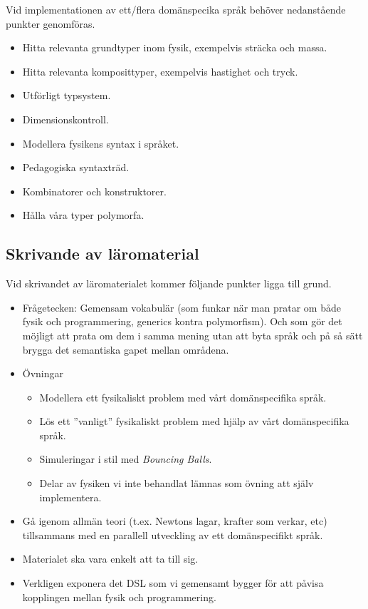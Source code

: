 \documentclass[12pt,a4paper]{scrartcl}
\begin{document}
Vid implementationen av ett/flera domänspecika språk behöver nedanstående punkter genomföras.

\begin{itemize}
    \item Hitta relevanta grundtyper inom fysik, exempelvis sträcka och massa.
    \item Hitta relevanta komposittyper, exempelvis hastighet och tryck.
    \item Utförligt typsystem.
    \item Dimensionskontroll.
    \item Modellera fysikens syntax i språket.
    \item Pedagogiska syntaxträd.
    \item Kombinatorer och konstruktorer.
    \item Hålla våra typer polymorfa.
\end{itemize}

\subsection{Skrivande av läromaterial}

Vid skrivandet av läromaterialet kommer följande punkter ligga till grund.

\begin{itemize}
    \item Frågetecken: Gemensam vokabulär (som funkar när man pratar om både fysik och programmering, generics kontra polymorfism). Och som gör det möjligt att prata om dem i samma mening utan att byta språk och på så sätt brygga det semantiska gapet mellan områdena.
    \item Övningar
        \begin{itemize}
            \item Modellera ett fysikaliskt problem med vårt domänspecifika språk.
            \item Lös ett ''vanligt'' fysikaliskt problem med hjälp av vårt domänspecifika språk.
            \item Simuleringar i stil med \textit{Bouncing Balls}.
            \item Delar av fysiken vi inte behandlat lämnas som övning att själv implementera.
        \end{itemize}
    \item Gå igenom allmän teori (t.ex. Newtons lagar, krafter som verkar, etc) tillsammans med en parallell utveckling av ett domänspecifikt språk.
    \item Materialet ska vara enkelt att ta till sig.
    \item Verkligen exponera det DSL som vi gemensamt bygger för att påvisa kopplingen mellan fysik och programmering.
\end{itemize}
\end{document}
